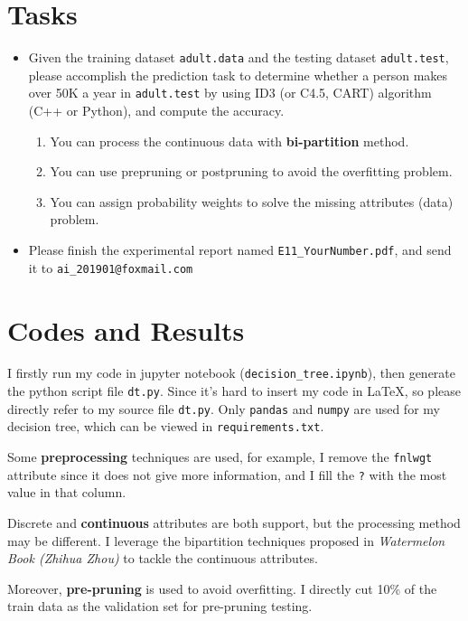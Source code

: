 \documentclass[a4paper, 11pt]{article}
\begin{document}
\section{Tasks}
\begin{itemize}
\item Given the training dataset \texttt{adult.data} and the testing dataset \texttt{adult.test}, please accomplish the prediction task to determine whether a person makes over 50K a year in \texttt{adult.test} by using ID3 (or C4.5, CART) algorithm (C++ or Python), and compute the accuracy.
\begin{enumerate}
\item You can process the continuous data with \textbf{bi-partition} method.
\item You can use prepruning or postpruning to avoid the overfitting problem.
\item You can assign probability weights to solve the missing attributes (data) problem.
\end{enumerate}

\item Please finish the experimental report named \texttt{E11\_YourNumber.pdf}, and send it to \texttt{ai\_201901@foxmail.com}
\end{itemize}

\section{Codes and Results}
I firstly run my code in jupyter notebook (\verb'decision_tree.ipynb'), then generate the python script file \verb'dt.py'.
Since it's hard to insert my code in \LaTeX, so please directly refer to my source file \verb'dt.py'.
Only \verb'pandas' and \verb'numpy' are used for my decision tree, which can be viewed in \verb'requirements.txt'.

Some \textbf{preprocessing} techniques are used, for example, I remove the \verb'fnlwgt' attribute since it does not give more information, and I fill the \verb'?' with the most value in that column.

Discrete and \textbf{continuous} attributes are both support, but the processing method may be different.
I leverage the bipartition techniques proposed in \emph{Watermelon Book (Zhihua Zhou)} to tackle the continuous attributes.

Moreover, \textbf{pre-pruning} is used to avoid overfitting.
I directly cut 10\% of the train data as the validation set for pre-pruning testing.
\end{document}
